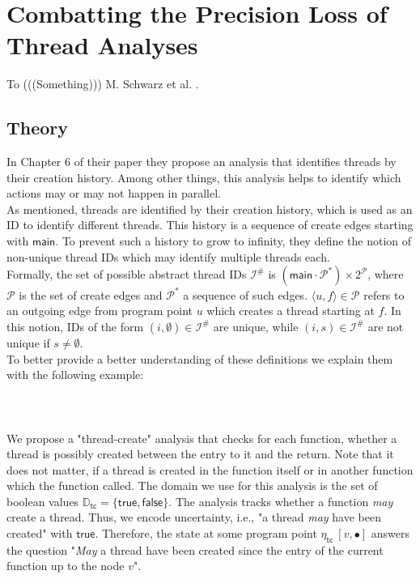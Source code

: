 
\chapter{Combatting the Precision Loss of Thread Analyses}\label{chapter:precisionLossThreadAnalyses}
  To (((Something))) M. Schwarz et al. \parencite{schwarz2023clustered}.
  \section{Theory}
  In Chapter 6 of their paper \parencite{schwarz2023clustered} they propose an analysis that identifies threads by their creation history. Among other things, this analysis helps to identify which actions may or may not happen in parallel.\\
  As mentioned, threads are identified by their creation history, which is used as an ID to identify different threads. This history is a sequence of create edges starting with $\textsf{main}$. 
  To prevent such a history to grow to infinity, they define the notion of non-unique thread IDs which may identify multiple threads each.\\
  Formally, the set of possible abstract thread IDs $\mathcal{I}^{\#}$ is $(\textsf{main}\cdot\mathcal{P}^*) \times 2^{\mathcal{P}}$, where $\mathcal{P}$ is the set of create edges and $\mathcal{P}^*$ a sequence of such edges. $\langle u, f \rangle \in \mathcal{P}$ refers to an outgoing edge from program point $u$ which creates a thread starting at $f$.
  In this notion, IDs of the form $(i, \emptyset) \in \mathcal{I}^{\#}$ are unique, while $(i, s) \in \mathcal{I}^{\#}$ are not unique if $s \neq \emptyset$.\\
  To better provide a better understanding of these definitions we explain them with the following example:\\
  \\
  \\
  \\
  We propose a "thread-create" analysis that checks for each function, whether a thread is possibly created between the entry to it and the return. Note that it does not matter, if a thread is created in the function itself or in another function which the function called. The domain we use for this analysis is the set of boolean values $\mathbb{D}_\textsf{tc} = \{\textsf{true}, \textsf{false}\}$. The analysis tracks whether a function \textit{may} create a thread. Thus, we encode uncertainty, i.e., "a thread \textit{may} have been created" with $\textsf{true}$. Therefore, the state at some program point $\eta_\textsf{tc}\ [v,\bullet]$ answers the question "\textit{May} a thread have been created since the entry of the current function up to the node $v$". 
  
